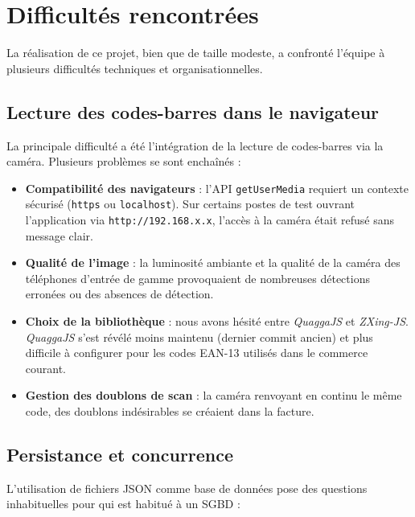 \documentclass[12pt,a4paper]{article}
\begin{document}
\section{Difficultés rencontrées}
\label{sec:difficultes}

La réalisation de ce projet, bien que de taille modeste, a confronté l'équipe à plusieurs difficultés techniques et organisationnelles.

\subsection{Lecture des codes-barres dans le navigateur}

La principale difficulté a été l'intégration de la lecture de codes-barres via la caméra. Plusieurs problèmes se sont enchaînés :

\begin{itemize}[leftmargin=1.5em]
    \item \textbf{Compatibilité des navigateurs} : l'API \texttt{getUserMedia} requiert un contexte sécurisé (\texttt{https} ou \texttt{localhost}). Sur certains postes de test ouvrant l'application via \texttt{http://192.168.x.x}, l'accès à la caméra était refusé sans message clair.
    \item \textbf{Qualité de l'image} : la luminosité ambiante et la qualité de la caméra des téléphones d'entrée de gamme provoquaient de nombreuses détections erronées ou des absences de détection.
    \item \textbf{Choix de la bibliothèque} : nous avons hésité entre \textit{QuaggaJS} et \textit{ZXing-JS}. \textit{QuaggaJS} s'est révélé moins maintenu (dernier commit ancien) et plus difficile à configurer pour les codes EAN-13 utilisés dans le commerce courant.
    \item \textbf{Gestion des doublons de scan} : la caméra renvoyant en continu le même code, des doublons indésirables se créaient dans la facture.
\end{itemize}

\subsection{Persistance et concurrence}

L'utilisation de fichiers JSON comme base de données pose des questions inhabituelles pour qui est habitué à un SGBD :
\end{document}
